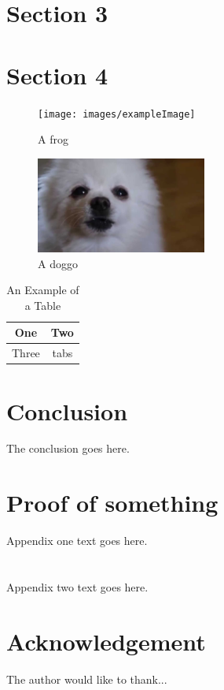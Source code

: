 \documentclass[journal,transmag]{IEEEtran}
\begin{document}
\section{Section 3}
	\lipsum[6-8]
	
\section{Section 4}
	\lipsum[9-10]
	
\begin{figure}[!t]
	\centering
	\texttt{[image: images/exampleImage]}
	\caption{A frog}
	\label{fig_frog}
\end{figure}

\begin{figure}[!t]
	\centering
	\includegraphics[width= 0.5\textwidth]{images/fig2}
        \caption{A doggo}
	\label{fig_pup}
\end{figure}

\begin{table}[!t]
	\renewcommand{\arraystretch}{1.3}
	\caption{An Example of a Table}
	\label{table_example}
	\centering
	\begin{tabular}{|c|c|}
		\hline
		One & Two\\
		\hline
		Three & tabs\\
		\hline
	\end{tabular}
\end{table}

\section{Conclusion}
The conclusion goes here.

\newpage

\appendices
\section{Proof of something}
	Appendix one text goes here.

\section{}
	Appendix two text goes here.

\section*{Acknowledgement}
	The author would like to thank...



\end{document}
